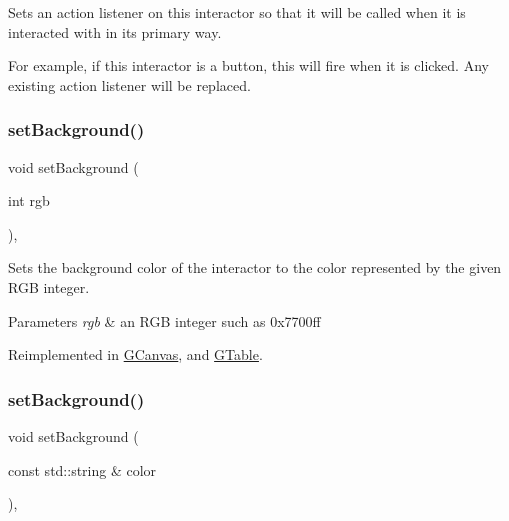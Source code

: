 Sets an action listener on this interactor so that it will be called when it is interacted with in its primary way. 

For example, if this interactor is a button, this will fire when it is clicked. Any existing action listener will be replaced. \mbox{\label{classGInteractor_acba7e546c2025c0a15ca4b4cc92043db}} 
\subsubsection{\texorpdfstring{set\+Background()}{setBackground()}\hspace{0.1cm}{\footnotesize\ttfamily [1/2]}}
{\footnotesize\ttfamily void set\+Background (\begin{DoxyParamCaption}\item[{int}]{rgb }\end{DoxyParamCaption})\hspace{0.3cm}{\ttfamily [virtual]}, {\ttfamily [inherited]}}



Sets the background color of the interactor to the color represented by the given R\+GB integer. 


\begin{DoxyParams}{Parameters}
{\em rgb} & an R\+GB integer such as 0x7700ff \\
\hline
\end{DoxyParams}


Reimplemented in \mbox{\hyperlink{classGCanvas_a10d305826534b55561ea88730fc9f6cd}{G\+Canvas}}, and \mbox{\hyperlink{classGTable_aefbd30fa3e699d49b6dd2c2a2d6e8c2b}{G\+Table}}.

\mbox{\label{classGInteractor_ab4677ab2474e68b07aa56605af92a84a}} 
\subsubsection{\texorpdfstring{set\+Background()}{setBackground()}\hspace{0.1cm}{\footnotesize\ttfamily [2/2]}}
{\footnotesize\ttfamily void set\+Background (\begin{DoxyParamCaption}\item[{const std\+::string \&}]{color }\end{DoxyParamCaption})\hspace{0.3cm}{\ttfamily [virtual]}, {\ttfamily [inherited]}}



